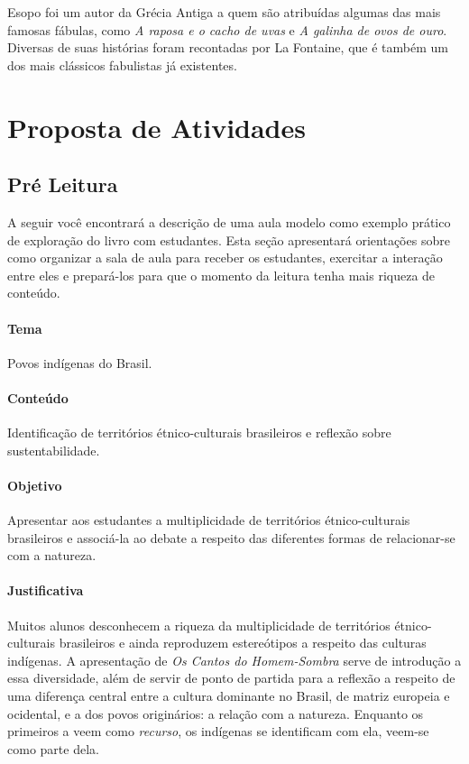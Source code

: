 \documentclass[11pt]{extarticle}
\begin{document}
Esopo foi um autor da Grécia Antiga a quem são atribuídas algumas das mais famosas fábulas, como \textit{A raposa e o cacho de uvas} e \textit{A galinha de ovos de ouro}. Diversas de suas histórias foram recontadas por La Fontaine, que é também um dos mais clássicos fabulistas já existentes.

\section{Proposta de Atividades}
\subsection{Pré Leitura}

A seguir você encontrará a descrição de uma aula modelo como exemplo prático de exploração do livro com estudantes. Esta seção apresentará orientações sobre como organizar a sala de aula para receber os estudantes, exercitar a interação entre eles e prepará-los para que o momento da leitura tenha mais riqueza de conteúdo.

\paragraph{Tema} Povos indígenas do Brasil.  

\paragraph{Conteúdo} Identificação de territórios étnico-culturais brasileiros e reflexão sobre sustentabilidade. 

\paragraph{Objetivo} Apresentar aos estudantes a multiplicidade de territórios étnico-culturais brasileiros e associá-la ao debate a respeito das diferentes formas de relacionar-se com a natureza.  

\paragraph{Justificativa} Muitos alunos desconhecem a riqueza da multiplicidade de territórios étnico-culturais brasileiros e ainda reproduzem estereótipos a respeito das culturas indígenas. A apresentação de \textit{Os Cantos do Homem-Sombra} serve de introdução a essa diversidade, além de servir de ponto de partida para a reflexão a respeito de uma diferença central entre a cultura dominante no Brasil, de matriz europeia e ocidental, e a dos povos originários: a relação com a natureza. Enquanto os primeiros a veem como \textit{recurso}, os indígenas se identificam com ela, veem-se como parte dela.      
\end{document}
